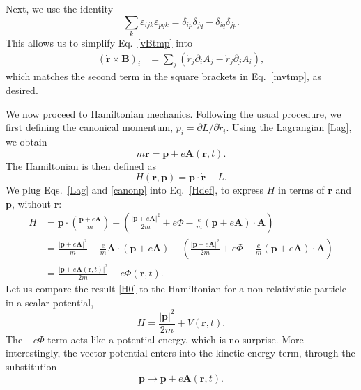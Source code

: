 \documentclass[prx,12pt]{revtex4-2}
\begin{document}
Next, we use the identity
\begin{equation}
  \sum_k \varepsilon_{ijk} \varepsilon_{pqk}
  = \delta_{ip} \delta_{jq} - \delta_{iq} \delta_{jp}.
\end{equation}
This allows us to simplify Eq.~\eqref{vBtmp} into
\begin{align}
  (\dot{\mathbf{r}} \times \mathbf{B})_i
  &= \sum_{j} \left( \dot{r}_j  \partial_i A_j - \dot{r}_j  \partial_j A_i\right),
\end{align}
which matches the second term in the square brackets in
Eq.~\eqref{mvtmp}, as desired.

We now proceed to Hamiltonian mechanics.  Following the usual
procedure, we first defining the canonical momentum, $p_i = \partial
L/\partial \dot{r}_i$.  Using the Lagrangian \eqref{Lag}, we obtain
\begin{equation}
  m \dot{\mathbf{r}} = \mathbf{p} + e \mathbf{A}(\mathbf{r},t).
  \label{canonp}
\end{equation}
The Hamiltonian is then defined as
\begin{equation}
  H(\mathbf{r},\mathbf{p}) = \mathbf{p} \cdot \dot{\mathbf{r}} - L.
  \label{Hdef}
\end{equation}
We plug Eqs.~\eqref{Lag} and \eqref{canonp} into Eq.~\eqref{Hdef}, to
express $H$ in terms of $\mathbf{r}$ and $\mathbf{p}$, without
$\dot{\mathbf{r}}$:
\begin{align}
  H &= \mathbf{p}\cdot \left(\frac{\mathbf{p}+e\mathbf{A}}{m}\right)
  - \left(\frac{|\mathbf{p}+e\mathbf{A}|^2}{2m}
  + e\Phi - \frac{e}{m}(\mathbf{p}+e\mathbf{A})\cdot \mathbf{A}\right) \\
  &= \frac{|\mathbf{p}+e\mathbf{A}|^2}{m}
  - \frac{e}{m}\mathbf{A}\cdot \left(\mathbf{p}+e\mathbf{A}\right)
  - \left(\frac{|\mathbf{p}+e\mathbf{A}|^2}{2m}
  + e\Phi - \frac{e}{m}(\mathbf{p}+e\mathbf{A})\cdot \mathbf{A}\right) \\
  &= \frac{|\mathbf{p}+e\mathbf{A}(\mathbf{r},t)|^2}{2m} - e\Phi(\mathbf{r},t).
  \label{H0}
\end{align}
Let us compare the result \eqref{H0} to the Hamiltonian for a
non-relativistic particle in a scalar potential,
\begin{equation*}
  H = \frac{|\mathbf{p}|^2}{2m} + V(\mathbf{r},t).
\end{equation*}
The $-e\Phi$ term acts like a potential energy, which is no surprise.
More interestingly, the vector potential enters into the kinetic
energy term, through the substitution
\begin{equation}
  \mathbf{p} \rightarrow \mathbf{p} + e\mathbf{A}(\mathbf{r},t).  
\end{equation}
\end{document}

